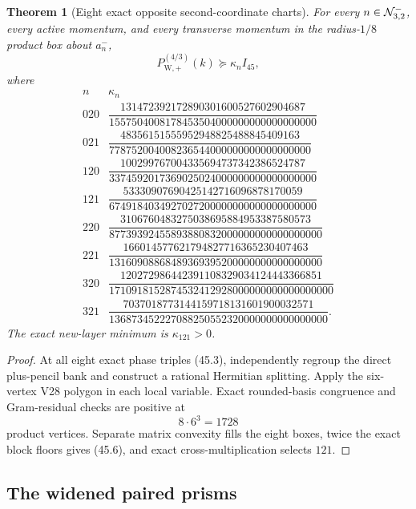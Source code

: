\documentclass[11pt,oneside]{article}
\newtheorem{theorem}{Theorem}[section]
\theoremstyle{definition}
\theoremstyle{remark}
\begin{document}
\begin{theorem}[Eight exact opposite second-coordinate charts]
\label{thm:newv45-eight-charts}
For every \(n\in{\cal N}_{3,2}^{-}\), every active momentum, and
every transverse momentum in the radius-\(1/8\) product box about
\(a_n^-\),
\[
 P_{\mathrm W,+}^{(4/3)}(k)\succeq\kappa_n I_{45},     \tag{45.5}
\]
where
\[
\begin{array}{c|c}
n&\kappa_n\\ \hline
020&\dfrac{131472392172890301600527602904687}
{1557504008178453504000000000000000000}\\[5pt]
021&\dfrac{48356151555952948825488845409163}
{778752004008236544000000000000000000}\\[5pt]
120&\dfrac{100299767004335694737342386524787}
{3374592017369025024000000000000000000}\\[5pt]
121&\dfrac{53330907690425142716096878170059}
{6749184034927027200000000000000000000}\\[5pt]
220&\dfrac{3106760483275038695884953387580573}
{87739392455893880832000000000000000000}\\[5pt]
221&\dfrac{166014577621794827716365230407463}
{13160908868489369395200000000000000000}\\[5pt]
320&\dfrac{120272986442391108329034124443366851}
{1710918152874532412928000000000000000000}\\[5pt]
321&\dfrac{7037018773144159718131601900032571}
{136873452227088250552320000000000000000}.
\end{array}                                             \tag{45.6}
\]
The exact new-layer minimum is \(\kappa_{121}>0\).
\end{theorem}

\begin{proof}
At all eight exact phase triples (45.3), independently regroup the
direct plus-pencil bank and construct a rational Hermitian
splitting.  Apply the six-vertex V28 polygon in each local
variable.  Exact rounded-basis congruence and Gram-residual checks
are positive at
\[
 8\cdot6^3=1728                                        \tag{45.7}
\]
product vertices.  Separate matrix convexity fills the eight
boxes, twice the exact block floors gives (45.6), and exact
cross-multiplication selects \(121\).
\end{proof}

\subsection{The widened paired prisms}
\end{document}
